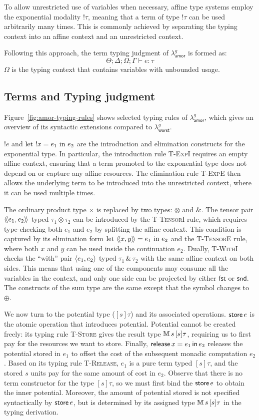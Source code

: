 To allow unrestricted use of variables when necessary, affine type systems employ the exponential modality $!\tau$, meaning that 
a term of type $!\tau$ can be used arbitrarily many times. This is commonly achieved by separating the typing context into an affine context and an unrestricted context.

Following this approach, the term typing judgment of $\lambda^g_{\mathsf{amor}}$ is formed as:
\[
\Theta;\Delta;\Omega;\Gamma\vdash e:\tau
\]
$\Omega$ is the typing context that contains variables with unbounded usage.

\subsection{Terms and Typing judgment}
Figure~\ref{fig:amor-typing-rules} shows selected typing rules of $\lambda^g_{\mathsf{amor}}$, which gives 
an overview of its syntactic extensions compared to $\lambda^g_{\mathsf{worst}}$.

$!e$ and $\text{let }!x = e_1 \text{ in } e_2$ are the introduction and elimination constructs for the exponential type.
In particular, the introduction rule \textsc{T-ExpI} requires an empty affine context, ensuring that a term promoted to the exponential type does not depend on or capture any affine resources.
The elimination rule \textsc{T-ExpE} then allows the underlying term to be introduced into the unrestricted context, where it can be used multiple times.
 
The ordinary product type $\times$ is replaced by two types: $\otimes$ and $\&$.
The tensor pair $\langle\!\langle e_1, e_2\rangle\!\rangle$ typed $\tau_1 \otimes \tau_2$ can be introduced by the \textsc{T-TensorI} rule, which requires type-checking both
$e_1$ and $e_2$ by splitting the affine context. This condition is captured by its elimination form $\text{let }\langle\!\langle x, y\rangle\!\rangle = e_1 \text{ in } e_2$ and the \textsc{T-TensorE} rule,
where both $x$ and $y$ can be used inside the continuation $e_2$. Dually, \textsc{T-WithI} checks the ``with'' pair $\langle e_1, e_2\rangle$ typed $\tau_1\, \& \,\tau_2$ with the same affine context 
on both sides. This means that using one of the components may consume all the variables in the context, and
only one side can be projected by either $\mathsf{fst}$ or $\mathsf{snd}$. The constructs of the sum type are the same except that the symbol
changes to $\oplus$.

We now turn to the potential type (\([s]\tau\)) and its associated operations. $\mathsf{store}\, e$ is the atomic operation 
that introduces potential. Potential cannot be created freely: its typing rule \textsc{T-Store} gives the result type 
$\mathbb{M}\,{s}\, [s]\tau$, requiring us to first pay for the resources we want to store.
Finally, $\mathsf{release}\, x = e_1 \, \mathsf{in}\, e_2$ releases the potential stored in $e_1$ to offset the cost of the subsequent monadic computation $e_2$.
Based on its typing rule \textsc{T-Release}, $e_1$ is a pure term typed $[s] \tau$, and the stored $s$ units pay for the same amount of 
cost in $e_2$. Observe that there is no term constructor for the type $[s]\tau$, so we must first bind the $\mathsf{store}\, e$ to obtain the inner potential.
Moreover, the amount of potential stored is not specified syntactically by $\mathsf{store}\, e$, but is determined by its assigned type $\mathbb{M}\,{s}\, [s]\tau$ in the typing derivation.


